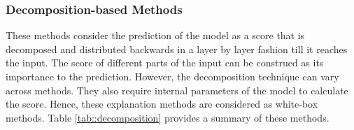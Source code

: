 





\subsubsection{Decomposition-based Methods}
\label{sec:sourav_white_decom}

These methods consider the prediction of the model as a score that is decomposed and distributed backwards in a layer by layer fashion till it reaches the input. The score of different parts of the input can be construed as its importance to the prediction. However, the decomposition technique can vary across methods. They also require internal parameters of the model to calculate the score. Hence, these explanation methods are considered as white-box methods. Table \ref{tab::decomposition} provides a summary of these methods. %

